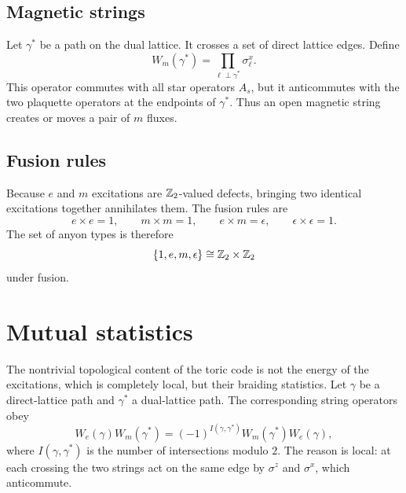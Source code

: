 \subsection{Magnetic strings}

Let \(\gamma^\ast\) be a path on the dual lattice.  It crosses a set of direct
lattice edges.  Define
\begin{equation}
\label{eq:toric-code-magnetic-string}
    W_m(\gamma^\ast)
    =
    \prod_{\ell\perp\gamma^\ast}\sigma^x_{\ell} .
\end{equation}
This operator commutes with all star operators \(A_s\), but it anticommutes with
the two plaquette operators at the endpoints of \(\gamma^\ast\).  Thus an open
magnetic string creates or moves a pair of \(m\) fluxes.

\subsection{Fusion rules}

Because \(e\) and \(m\) excitations are \(\mathbb{Z}_2\)-valued defects, bringing two
identical excitations together annihilates them.  The fusion rules are
\begin{equation}
\label{eq:toric-code-fusion-rules}
    e\times e=1,
    \qquad
    m\times m=1,
    \qquad
    e\times m=\epsilon,
    \qquad
    \epsilon\times\epsilon=1 .
\end{equation}
The set of anyon types is therefore
\begin{equation}
\label{eq:toric-code-anyon-types}
    \{1,e,m,\epsilon\}\cong \mathbb{Z}_2\times\mathbb{Z}_2
\end{equation}
under fusion.

\section{Mutual statistics}
\label{sec:toric-code-mutual-statistics}

The nontrivial topological content of the toric code is not the energy of the
excitations, which is completely local, but their braiding statistics.  Let
\(\gamma\) be a direct-lattice path and \(\gamma^\ast\) a dual-lattice path.  The
corresponding string operators obey
\begin{equation}
\label{eq:toric-code-string-crossing-algebra}
    W_e(\gamma)W_m(\gamma^\ast)
    =
    (-1)^{I(\gamma,\gamma^\ast)}
    W_m(\gamma^\ast)W_e(\gamma),
\end{equation}
where \(I(\gamma,\gamma^\ast)\) is the number of intersections modulo \(2\).
The reason is local: at each crossing the two strings act on the same edge by
\(\sigma^z\) and \(\sigma^x\), which anticommute.

